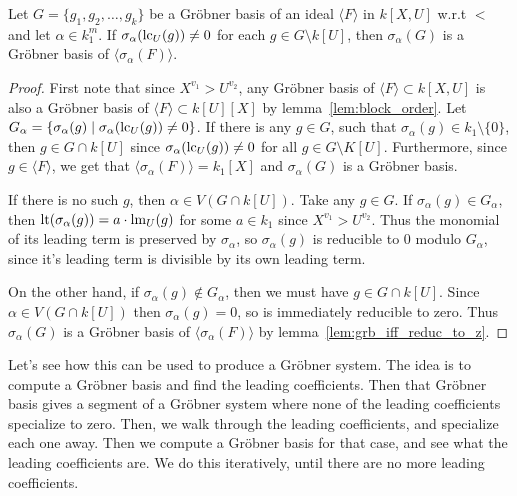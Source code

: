 \begin{lemma}\label{lem:grb_if_nmap_to_z}
  Let $G = \{g_{1}, g_{2}, \dots, g_{k}\}$ be a Gröbner basis of an ideal $\langle F \rangle$ in $k[X, U]$ w.r.t $<$ and let $\alpha \in k_{1}^{m}$. If $\sigma_{\alpha}(\operatorname{lc}_{U}(g)) \neq 0$ for each $g \in G \setminus k[U]$, then $\sigma_{\alpha}(G)$ is a Gröbner basis of $\langle \sigma_{\alpha}(F) \rangle$.
\end{lemma}
\begin{proof}
  First note that since $X^{v_{1}} > U^{v_{2}}$, any Gröbner basis of $\langle F \rangle \subset k[X, U]$ is also a Gröbner basis of $\langle F \rangle \subset k[U][X]$ by lemma~\ref{lem:block_order}. Let $G_{\alpha} = \{\sigma_{\alpha}(g) \mid \sigma_{\alpha}(\operatorname{lc}_{U}(g)) \neq 0\}$. If there is any $g \in G$, such that $\sigma_{\alpha}(g) \in k_{1} \setminus \{0\}$, then $g \in G \cap k[U]$ since $\sigma_{\alpha}(\operatorname{lc}_{U}(g)) \neq 0$ for all $g \in G \setminus K[U]$. Furthermore, since $g \in \langle F \rangle$, we get that $\langle \sigma_{\alpha}(F) \rangle = k_{1}[X]$ and $\sigma_{\alpha}(G)$ is a Gröbner basis.

  If there is no such $g$, then $\alpha \in V(G \cap k[U])$. Take any $g \in G$. If $\sigma_{\alpha}(g) \in G_{\alpha}$, then $\operatorname{lt}(\sigma_{\alpha}(g)) = a \cdot \operatorname{lm}_{U}(g)$ for some $a \in k_{1}$ since $X^{v_{1}} > U^{v_{2}}$. Thus the monomial of its leading term is preserved by $\sigma_{\alpha}$, so $\sigma_{\alpha}(g)$ is reducible to $0$ modulo $G_{\alpha}$, since it's leading term is divisible by its own leading term.

  On the other hand, if $\sigma_{\alpha}(g) \notin G_{\alpha}$, then we must have $g \in G \cap k[U]$. Since $\alpha \in V(G \cap k[U])$ then $\sigma_{\alpha}(g) = 0$, so is immediately reducible to zero. Thus $\sigma_{\alpha}(G)$ is a Gröbner basis of $\langle \sigma_{\alpha}(F) \rangle$ by lemma~\ref{lem:grb_iff_reduc_to_z}.
\end{proof}

Let's see how this can be used to produce a Gröbner system. The idea is to compute a Gröbner basis and find the leading coefficients. Then that Gröbner basis gives a segment of a Gröbner system where none of the leading coefficients specialize to zero. Then, we walk through the leading coefficients, and specialize each one away. Then we compute a Gröbner basis for that case, and see what the leading coefficients are. We do this iteratively, until there are no more leading coefficients.

